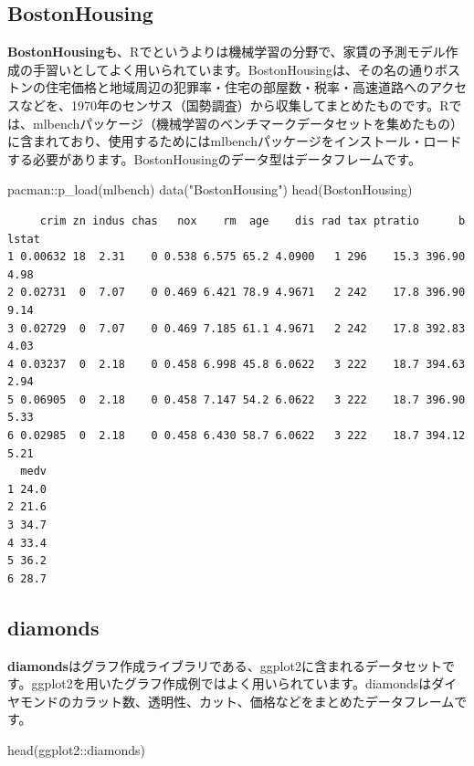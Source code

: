 \documentclass[
  letterpaper,
  DIV=11,
  numbers=noendperiod]{scrreprt}
\newenvironment{Shaded}{\begin{snugshade}}{\end{snugshade}}
\newcommand{\FunctionTok}[1]{\textcolor[rgb]{0.28,0.35,0.67}{#1}}
\newcommand{\NormalTok}[1]{\textcolor[rgb]{0.00,0.23,0.31}{#1}}
\newcommand{\SpecialCharTok}[1]{\textcolor[rgb]{0.37,0.37,0.37}{#1}}
\newcommand{\StringTok}[1]{\textcolor[rgb]{0.13,0.47,0.30}{#1}}
\begin{document}
\hypertarget{bostonhousing}{%
\subsection{BostonHousing}\label{bostonhousing}}

\textbf{BostonHousing}も、Rでというよりは機械学習の分野で、家賃の予測モデル作成の手習いとしてよく用いられています。BostonHousingは、その名の通りボストンの住宅価格と地域周辺の犯罪率・住宅の部屋数・税率・高速道路へのアクセスなどを、1970年のセンサス（国勢調査）から収集してまとめたものです。Rでは、mlbenchパッケージ（機械学習のベンチマークデータセットを集めたもの）に含まれており、使用するためにはmlbenchパッケージをインストール・ロードする必要があります。BostonHousingのデータ型はデータフレームです。

\begin{Shaded}
\begin{Highlighting}[]
\NormalTok{pacman}\SpecialCharTok{::}\FunctionTok{p\_load}\NormalTok{(mlbench)}
\FunctionTok{data}\NormalTok{(}\StringTok{"BostonHousing"}\NormalTok{)}
\FunctionTok{head}\NormalTok{(BostonHousing)}
\end{Highlighting}
\end{Shaded}

\begin{verbatim}
     crim zn indus chas   nox    rm  age    dis rad tax ptratio      b lstat
1 0.00632 18  2.31    0 0.538 6.575 65.2 4.0900   1 296    15.3 396.90  4.98
2 0.02731  0  7.07    0 0.469 6.421 78.9 4.9671   2 242    17.8 396.90  9.14
3 0.02729  0  7.07    0 0.469 7.185 61.1 4.9671   2 242    17.8 392.83  4.03
4 0.03237  0  2.18    0 0.458 6.998 45.8 6.0622   3 222    18.7 394.63  2.94
5 0.06905  0  2.18    0 0.458 7.147 54.2 6.0622   3 222    18.7 396.90  5.33
6 0.02985  0  2.18    0 0.458 6.430 58.7 6.0622   3 222    18.7 394.12  5.21
  medv
1 24.0
2 21.6
3 34.7
4 33.4
5 36.2
6 28.7
\end{verbatim}

\hypertarget{diamonds}{%
\subsection{diamonds}\label{diamonds}}

\textbf{diamonds}はグラフ作成ライブラリである、ggplot2に含まれるデータセットです。ggplot2を用いたグラフ作成例ではよく用いられています。diamondsはダイヤモンドのカラット数、透明性、カット、価格などをまとめたデータフレームです。

\begin{Shaded}
\begin{Highlighting}[]
\FunctionTok{head}\NormalTok{(ggplot2}\SpecialCharTok{::}\NormalTok{diamonds)}
\end{Highlighting}
\end{Shaded}
\end{document}

